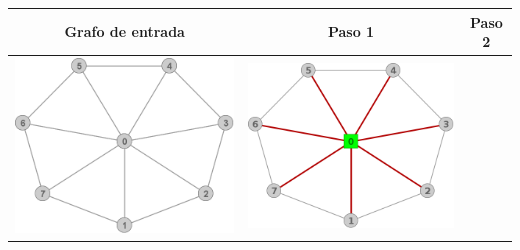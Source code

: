 \begin{center}
\begin{tabular}{ |c||c| }
			\hline
		 \end{tabular}
		 \begin{tabular}{ |c||c||c| }
			\hline
			Grafo de entrada & Paso 1 & Paso 2 \\
			\hline\hline
			\includegraphics[scale = 0.25]{img/ej3/constructiva_golosa/Wheel_st0.png} &
			\includegraphics[scale = 0.25]{img/ej3/constructiva_golosa/Wheel_st1.png} &

\end{tabular}
\end{center}
